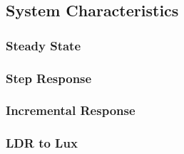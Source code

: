 \subsection{System Characteristics}
\label{sec:SystemCharacteristics}

\subsubsection{Steady State}
\label{sub:SteadyState}

\begin{figure}[h]
    \centering
    \resizebox{\textwidth}{!}{}
    \caption{}
    \label{fig:}
\end{figure}

\begin{figure}[h]
    \centering
    \resizebox{\textwidth}{!}{}
    \caption{}
    \label{fig:}
\end{figure}

\subsubsection{Step Response}
\label{sub:StepResponse}

\subsubsection{Incremental Response}
\label{sub:IncrementalResponse}

\subsubsection{LDR to Lux}
\label{sub:LDRtoLux}

\begin{figure}[h]
    \centering
    \resizebox{\textwidth}{!}{}
    \caption{}
    \label{fig:}
\end{figure}

